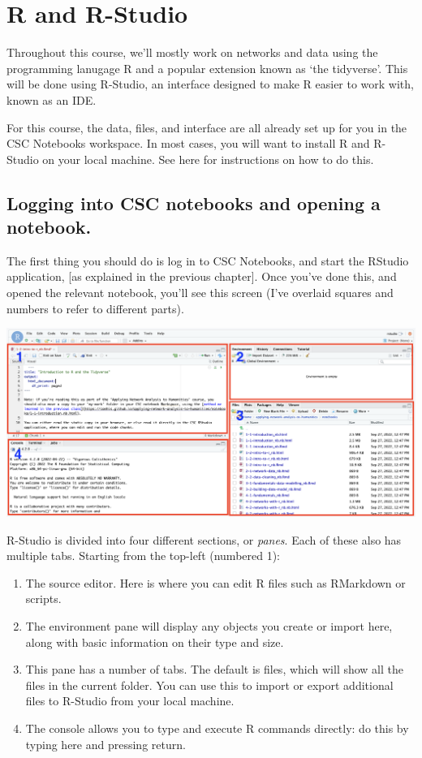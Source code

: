 \documentclass[
]{book}
\begin{document}
\hypertarget{r-and-r-studio}{%
\section{R and R-Studio}\label{r-and-r-studio}}

Throughout this course, we'll mostly work on networks and data using the programming lanugage R and a popular extension known as `the tidyverse'. This will be done using R-Studio, an interface designed to make R easier to work with, known as an IDE.

For this course, the data, files, and interface are all already set up for you in the CSC Notebooks workspace. In most cases, you will want to install R and R-Studio on your local machine. See here for instructions on how to do this.

\hypertarget{logging-into-csc-notebooks-and-opening-a-notebook.}{%
\subsection{Logging into CSC notebooks and opening a notebook.}\label{logging-into-csc-notebooks-and-opening-a-notebook.}}

The first thing you should do is log in to CSC Notebooks, and start the RStudio application, {[}as explained in the previous chapter{]}. Once you've done this, and opened the relevant notebook, you'll see this screen (I've overlaid squares and numbers to refer to different parts).

\includegraphics{images/Screenshot 2022-09-27 at 12.50.25.png}

R-Studio is divided into four different sections, or \emph{panes}. Each of these also has multiple tabs. Starting from the top-left (numbered 1):

\begin{enumerate}
\def\labelenumi{\arabic{enumi}.}
\item
  The source editor. Here is where you can edit R files such as RMarkdown or scripts.
\item
  The environment pane will display any objects you create or import here, along with basic information on their type and size.
\item
  This pane has a number of tabs. The default is files, which will show all the files in the current folder. You can use this to import or export additional files to R-Studio from your local machine.
\item
  The console allows you to type and execute R commands directly: do this by typing here and pressing return.
\end{enumerate}
\end{document}
